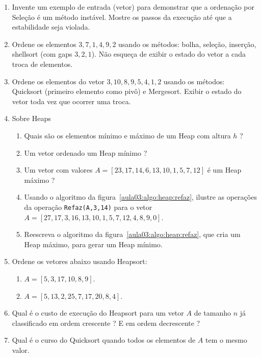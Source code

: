 \begin{enumerate}
\item Invente um exemplo de entrada (vetor) para demonstrar que a ordenação
por Seleção é um método instável.
Mostre os passos da execução até que a estabilidade seja violada.

\item Ordene os elementos $3, 7, 1, 4, 9, 2$ usando os métodos: bolha, seleção,
inserção, shellsort (com gaps $3, 2, 1$). Não esqueça de exibir o estado do vetor a cada troca
de elementos.


\item Ordene os elementos do vetor $3, 10, 8, 9, 5, 4, 1, 2$ usando os métodos: 
Quicksort (primeiro elemento como pivô) e Mergesort. Exibir o estado do vetor toda vez que ocorrer 
uma troca.

\item Sobre Heaps
	\begin{enumerate}
	\item Quais são os elementos mínimo e máximo de um Heap com altura $h$ ?
	\item Um vetor ordenado um Heap mínimo ?
	\item Um vetor com valores $A = [23, 17, 14, 6, 13, 10, 1, 5, 7, 12]$ é um Heap máximo ?
	\item Usando o algoritmo da figura~\ref{aula03:algo:heap:refaz}, ilustre as operações
	da operação \lstinline{Refaz(A,3,14)} para o vetor
	$A = [27, 17, 3, 16, 13, 10, 1, 5, 7, 12, 4, 8, 9, 0]$.
	\item Reescreva o algoritmo da figura~\ref{aula03:algo:heap:refaz}, que cria
	um Heap máximo, para gerar um Heap mínimo.
	\end{enumerate}

\item Ordene os vetores abaixo usando Heapsort:
	\begin{enumerate}
	\item $A = [5, 3, 17, 10, 8, 9]$.
	\item $A = [5, 13, 2, 25, 7, 17, 20, 8, 4]$.
	\end{enumerate}

\item Qual é o custo de execução do Heapsort para um vetor $A$ de tamanho $n$ já classificado
em ordem crescente ? E em ordem decrescente ?

\item Qual é o curso do Quicksort quando todos os elementos de $A$ tem o mesmo
valor.


\end{enumerate}
